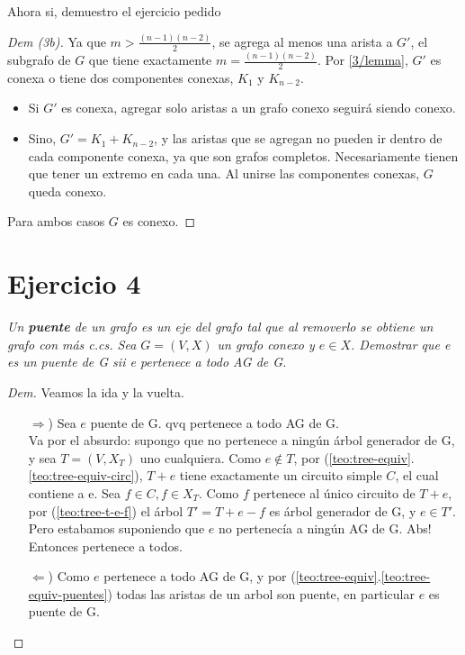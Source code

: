 \documentclass[12pt, a4paper]{report}
\theoremstyle{definition} %
\begin{document}
\begin{enumerate}[a)]
    Ahora si, demuestro el ejercicio pedido
    \begin{proof}[Dem (3b)]
        Ya que $m > \frac{(n-1)(n-2)}{2}$, se agrega al menos una arista a $G'$, el subgrafo de $G$ que tiene exactamente $m = \frac{(n-1)(n-2)}{2}$. Por \eqref{3/lemma}, $G'$ es conexa o tiene dos componentes conexas, $K_1$ y $K_{n-2}$.
        
        \begin{itemize}
            \item Si $G'$ es conexa, agregar solo aristas a un grafo conexo seguirá siendo conexo.
            \item Sino, $G' = K_1 + K_{n-2}$, y las aristas que se agregan no pueden ir dentro de cada componente conexa, ya que son grafos completos. Necesariamente tienen que tener un extremo en cada una. Al unirse las componentes conexas, $G$ queda conexo.
        \end{itemize}

        Para ambos casos $G$ es conexo.
    \end{proof}
    
\end{enumerate}

\section*{Ejercicio 4}

\textit{Un \textbf{puente} de un grafo es un eje del grafo tal que al removerlo
se obtiene un grafo con más c.cs. Sea $G = (V, X)$ un grafo conexo y $e \in X$.
Demostrar que e es un puente de G sii e pertenece a todo AG de G.}

\begin{proof}[Dem]
    Veamos la ida y la vuelta.

    \begin{enumerate}
        \item[$\Rightarrow$)] Sea $e$ puente de G. qvq pertenece a todo AG de G.\\
        Va por el absurdo: supongo que no pertenece a ningún árbol generador de G, y sea $T = (V, X_T)$ uno cualquiera. Como $e \notin T$, por (\ref{teo:tree-equiv}.\ref{teo:tree-equiv-circ}), $T + e$ tiene exactamente un circuito simple $C$, el cual contiene a e. Sea $f \in C, f \in X_T$. Como $f$ pertenece al único circuito de $T + e$, por (\ref{teo:tree-t-e-f}) el árbol $T' = T + e - f$ es árbol generador de G, y $e \in T'$. Pero estabamos suponiendo que $e$ no pertenecía a ningún AG de G. Abs! Entonces pertenece a todos.

        \item[$\Leftarrow$)] Como $e$ pertenece a todo AG de G, y por
        (\ref{teo:tree-equiv}.\ref{teo:tree-equiv-puentes}) todas las aristas de un arbol son puente, en particular $e$ es puente de G.
    \end{enumerate}

\end{proof}
\end{document}
